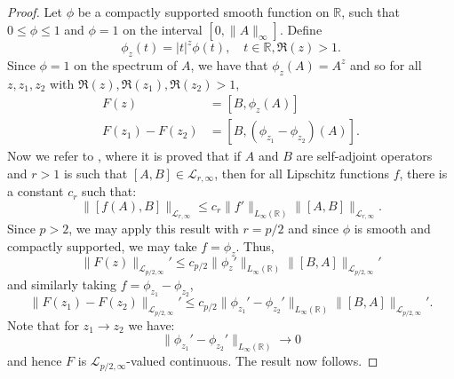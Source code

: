 \begin{proof}
        Let $\phi$ be a compactly supported smooth function on $\mathbb{R}$, such that $0 \leq \phi \leq 1$ and $\phi = 1$ on the interval
        $[0,\|A\|_\infty]$. Define
        \begin{equation*}
            \phi_z(t) = |t|^z\phi(t),\quad t \in \mathbb{R}, \Re(z) > 1.
        \end{equation*}
        Since $\phi = 1$ on the spectrum of $A$, we have that $\phi_z(A) = A^z$ and so for all $z,z_1,z_2$ with $\Re(z), \Re(z_1), \Re(z_2) > 1$,
        \begin{align*}
            F(z) &= [B,\phi_z(A)]\\
            F(z_1)-F(z_2) &= [B,(\phi_{z_1}-\phi_{z_2})(A)].
        \end{align*}
        Now we refer to \cite{PS-acta}, where it is proved that if $A$ and $B$ are self-adjoint operators and $r > 1$ is such that $[A,B] \in \mathcal{L}_{r,\infty}$,
        then for all Lipschitz functions $f$, there is a constant $c_r$ such that:
        \begin{equation*}
            \|[f(A),B]\|_{\mathcal{L}_{r,\infty}} \leq c_r\|f'\|_{L_\infty(\mathbb{R})}\|[A,B]\|_{\mathcal{L}_{r,\infty}}.
        \end{equation*}
        Since $p > 2$, we may apply this result with $r = p/2$ and since $\phi$ is smooth and compactly supported,
        we may take $f = \phi_{z}$. Thus,
        \begin{equation*}
            \|F(z)\|_{\mathcal{L}_{p/2,\infty}}' \leq c_{p/2}\|\phi_z'\|_{L_\infty(\mathbb{R})}\|[B,A]\|_{\mathcal{L}_{p/2,\infty}}'
        \end{equation*} 
        and similarly taking $f = \phi_{z_1}-\phi_{z_2}$,
        \begin{equation*}
            \|F(z_1)-F(z_2)\|_{\mathcal{L}_{p/2,\infty}}' \leq c_{p/2}\|\phi_{z_1}'-\phi_{z_2}'\|_{L_\infty(\mathbb{R})}\|[B,A]\|_{\mathcal{L}_{p/2,\infty}}'.
        \end{equation*}
        Note that for $z_1\to z_2$ we have:
        \begin{equation*}
            \|\phi_{z_1}'-\phi_{z_2}'\|_{L_\infty(\mathbb{R})}\to 0
        \end{equation*}
        and hence $F$ is $\mathcal{L}_{p/2,\infty}$-valued continuous. The result now follows.
    \end{proof}

